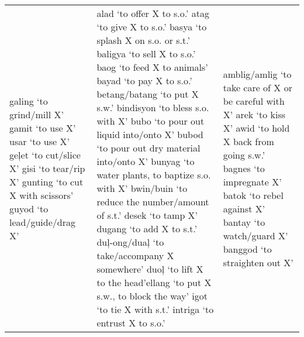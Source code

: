 \begin{table}
{\begin{tabular} {
        >{\RaggedRight\arraybackslash}p{4.55cm}
        >{\RaggedRight\arraybackslash}p{4.1cm}
        >{\RaggedRight\arraybackslash}p{4.2cm}
                    }
galing ‘to grind/mill X’\newline
gamit ‘to use X’\newline 
usar ‘to use X’\newline 
geļet ‘to cut/slice X’\newline
gisi ‘to tear/rip X’\newline 
gunting ‘to cut X with scissors’\newline 
guyod ‘to lead/guide/drag X’ %
&
alad ‘to offer X to s.o.’\newline 
atag ‘to give X to s.o.’\newline 
basya ‘to splash X on s.o. or s.t.’\newline 
baligya ‘to sell X to s.o.’\newline 
baog ‘to feed X to animals’\newline 
bayad ‘to pay X to s.o.’\newline 
betang/batang ‘to put X s.w.’\newline 
bindisyon ‘to bless s.o. with X’\newline 
bubo ‘to pour out liquid into/onto X’\newline 
bubod ‘to pour out dry material into/onto X’\newline
bunyag ‘to water plants, to baptize s.o. with X’\newline
bwin/buin ‘to reduce the number/amount of s.t.’\newline
desek ‘to tamp X’\newline
dugang ‘to add X to s.t.’\newline
duļ-ong/duaļ ‘to take/accompany X somewhere’\newline
duoļ ‘to lift X to the head’\newline ellang ‘to put X s.w., to block the way’\newline 
igot ‘to tie X with s.t.’\newline 
intriga ‘to entrust X to s.o.’ %
&
amblig/amlig ‘to take care of X or be careful with X’\newline 
arek ‘to kiss X’\newline 
awid ‘to hold X back from going s.w.’\newline 
bagnes ‘to impregnate X’\newline 
batok ‘to rebel against X’\newline 
bantay ‘to watch/guard X’\newline 
banggod ‘to straighten out X’\newline 

\end{tabular}}
\end{table}
